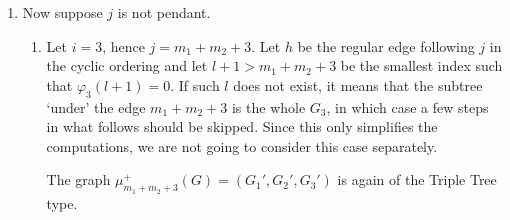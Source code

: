 \documentclass[12pt]{amsart}
\theoremstyle{plain}
\theoremstyle{remark}
\theoremstyle{definition}
\begin{document}
\begin{enumerate}
\begin{enumerate}
 Now we apply $(\widetilde{\mu}_{\mu_j^+(G)}^{st})^{-1}$. Observe that $(\widetilde{\mu}_{\mu_j^+(G)}^{st})^{-1}$ is just $(\mu_{G}^{st})^{-1}$ without $\mu_3^-$. Therefore,
   $$\mathcal{T}_{m-1} = \mathcal{T}_3' =  \bigg(P_3 \xrightarrow{\begin{pmatrix} -\alpha_1 \\ 
 \alpha_2 \end{pmatrix}} P_1\oplus P_{2} \xrightarrow{\begin{pmatrix} \delta_1 & \delta_2 \end{pmatrix}} P_{m}  \xrightarrow{soc} P_{m}\bigg) [3].  $$
 $$\mathcal{T}_i = \mathcal{T}_{i+1}' = P_{i+1}, \quad 3 \leq i \leq m-2.$$
 $$\mathcal{T}_m = \mathcal{T}'_m = P_m, \mathcal{T}_1 = \mathcal{T}_1' = P_1, \mathcal{T}_2 = \mathcal{T}_2' = P_2.$$ 
We have $\mathcal{H}(\Lambda) = t_m^2 \circ t_{m-1} \circ \dots \circ t_4 \circ t_3 \circ t_1 \circ t_2 \circ t_3[-2](\Lambda)$ (see Lemma \ref{twistseq1}).  
 
 \item Now suppose $j$ is not pendant.  
 
 \begin{enumerate}
     \item Let $i=3$, hence $j = m_1+m_2+3$. Let $h$ be the regular edge following $j$ in the cyclic ordering and let $l+1 > m_1+m_2+3$ be the smallest index such that $\varphi_3(l+1) = 0$. If such $l$ does not exist, it means that the subtree `under' the edge $m_1 + m_2+3$ is the whole $G_3$, in which case a few steps in what follows should be skipped. Since this only simplifies the computations, we are not going to consider this case separately.
     
     The graph $\mu_{m_1+m_2+3}^+(G) = (G_1', G_2', G_3')$ is again of the Triple Tree type. 
     \begin{center}
        

\end{center}
\end{enumerate}
\end{enumerate}
\end{enumerate}
\end{document}

